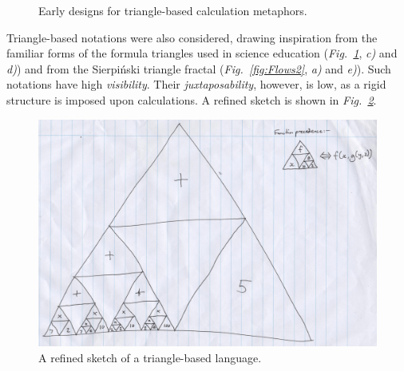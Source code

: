 \documentclass[12pt,twoside,notitlepage,xetex]{report}
\begin{document}
\begin{center}
\begin{figure}[H]
\begin{center}
{{\begin{center}
\end{center}}}
\end{center}
\caption{Early designs for triangle-based calculation metaphors.}
\label{fig:Tris1}
\end{figure}
\end{center}

Triangle-based notations were also considered, drawing inspiration from the familiar forms of the formula triangles used in science education (\emph{Fig.~\ref{fig:Tris1}}, \emph{c)} and \emph{d)}) and from the Sierpiński triangle fractal (\emph{Fig.~\ref{fig:Flows2}}, \emph{a)} and \emph{e)}).  Such notations have high \emph{visibility}.  Their \emph{juxtaposability}, however, is low, as a rigid structure is imposed upon calculations.  A refined sketch is shown in \emph{Fig.~\ref{fig:Tris2}}.

\begin{center}
\begin{figure}[H]
\begin{center}
\includegraphics[width=\textwidth]{figs/mockups/sketches/31/31a.jpg}
\end{center}
\caption{A refined sketch of a triangle-based language.}
\label{fig:Tris2}
\end{figure}
\end{center}
\end{document}

